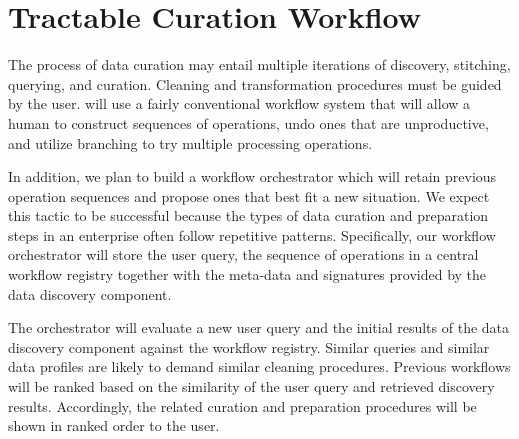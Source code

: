 \section{Tractable Curation Workflow}
\label{sec:workflow}

The process of data curation may entail multiple iterations of discovery,
stitching, querying, and curation. Cleaning and
transformation procedures must be guided by the user. \dcv will use a fairly
conventional workflow system that will allow a human to construct sequences of
operations, undo ones that are unproductive, and utilize branching to try
multiple processing operations.


In addition, we plan to build a workflow orchestrator which will retain previous
operation sequences and propose ones that best fit a new situation. We
expect this tactic to be successful because the types of data curation and
preparation steps in an enterprise often follow repetitive patterns.
Specifically, our workflow orchestrator will store the user query, the sequence
of operations in a central workflow registry together with the meta-data and
signatures provided by the data discovery component. 


The orchestrator will evaluate a new user query and the initial results of
the data discovery component against the workflow registry. Similar queries and
similar data profiles are likely to demand similar cleaning procedures. Previous
workflows will be ranked based on the similarity of the user query and retrieved
discovery results. Accordingly, the related curation and preparation procedures
will be shown in ranked order to the user.
